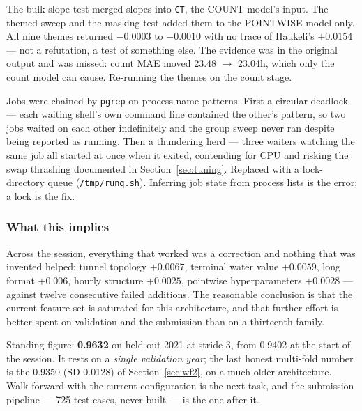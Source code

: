 \begin{finding}
The bulk slope test merged slopes into \texttt{CT}, the COUNT model's input. The themed sweep and
the masking test added them to the POINTWISE model only. All nine themes returned $-0.0003$ to
$-0.0010$ with no trace of Haukeli's $+0.0154$ --- not a refutation, a test of something else.
The evidence was in the original output and was missed: count MAE moved 23.48 $\to$ 23.04h, which
only the count model can cause. Re-running the themes on the count stage.
\end{finding}

\begin{finding}
Jobs were chained by \texttt{pgrep} on process-name patterns. First a circular deadlock --- each
waiting shell's own command line contained the other's pattern, so two jobs waited on each other
indefinitely and the group sweep never ran despite being reported as running. Then a thundering
herd --- three waiters watching the same job all started at once when it exited, contending for
CPU and risking the swap thrashing documented in Section~\ref{sec:tuning}. Replaced with a
lock-directory queue (\texttt{/tmp/runq.sh}). Inferring job state from process lists is the
error; a lock is the fix.
\end{finding}

\subsubsection*{What this implies}

\begin{finding}
Across the session, everything that worked was a correction and nothing that was invented helped:
tunnel topology $+0.0067$, terminal water value $+0.0059$, long format $+0.006$, hourly structure
$+0.0025$, pointwise hyperparameters $+0.0028$ --- against twelve consecutive failed additions.
The reasonable conclusion is that the current feature set is saturated for this architecture, and
that further effort is better spent on validation and the submission than on a thirteenth family.
\end{finding}

Standing figure: \textbf{0.9632} on held-out 2021 at stride 3, from 0.9402 at the start of the
session. It rests on a \emph{single validation year}; the last honest multi-fold number is the
0.9350 (SD 0.0128) of Section~\ref{sec:wf2}, on a much older architecture. Walk-forward with the
current configuration is the next task, and the submission pipeline --- 725 test cases, never
built --- is the one after it.
